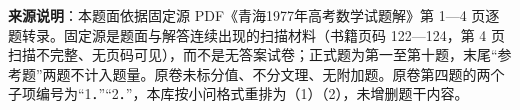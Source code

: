 


\begin{gktip}
\textbf{来源说明}：本题面依据固定源 PDF《青海1977年高考数学试题解》第 1—4 页逐题转录。固定源是题面与解答连续出现的扫描材料（书籍页码 122—124，第 4 页扫描不完整、无页码可见），而不是无答案试卷；正式题为第一至第十题，末尾“参考题”两题不计入题量。原卷未标分值、不分文理、无附加题。原卷第四题的两个子项编号为“1．”“2．”，本库按小问格式重排为（1）（2），未增删题干内容。
\end{gktip}

\par\medskip

